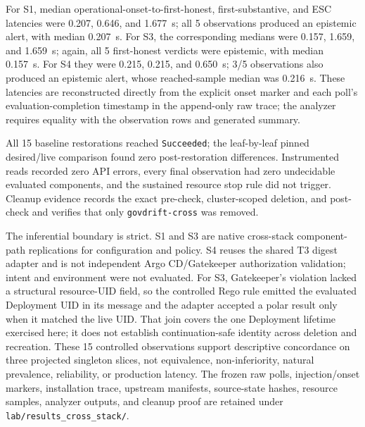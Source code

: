 For S1, median operational-onset-to-first-honest, first-substantive, and ESC
latencies were
0.207, 0.646, and 1.677~s; all 5 observations produced an epistemic alert,
with median 0.207~s. For S3, the corresponding medians were 0.157, 1.659,
and 1.659~s; again, all 5 first-honest verdicts were epistemic, with median
0.157~s. For S4 they were 0.215, 0.215, and 0.650~s; 3/5 observations also
produced an epistemic alert, whose reached-sample median was 0.216~s. These
latencies are reconstructed directly from the explicit onset marker and each
poll's evaluation-completion timestamp in the append-only raw trace; the
analyzer requires equality with the observation rows and generated summary.

All 15 baseline restorations reached \texttt{Succeeded}; the leaf-by-leaf
pinned desired/live comparison found zero post-restoration differences.
Instrumented reads recorded zero API errors, every final observation had zero
undecidable evaluated components, and the sustained resource stop rule did not
trigger. Cleanup evidence records the exact pre-check, cluster-scoped deletion,
and post-check and verifies that only \texttt{govdrift-cross} was removed.

The inferential boundary is strict. S1 and S3 are native cross-stack
component-path replications for configuration and policy. S4 reuses the shared
T3 digest adapter and is not independent Argo CD/Gatekeeper authorization
validation; intent and environment were not evaluated. For S3, Gatekeeper's
violation lacked a structural resource-UID field, so the controlled Rego rule
emitted the evaluated Deployment UID in its message and the adapter accepted a
polar result only when it matched the live UID. That join covers the one
Deployment lifetime exercised here; it does not establish continuation-safe
identity across deletion and recreation. These 15 controlled observations
support descriptive concordance on three projected singleton slices, not
equivalence, non-inferiority, natural prevalence, reliability, or production
latency. The frozen raw polls, injection/onset markers, installation trace,
upstream manifests, source-state hashes, resource samples, analyzer outputs,
and cleanup proof are retained under \texttt{lab/results\_cross\_stack/}.

